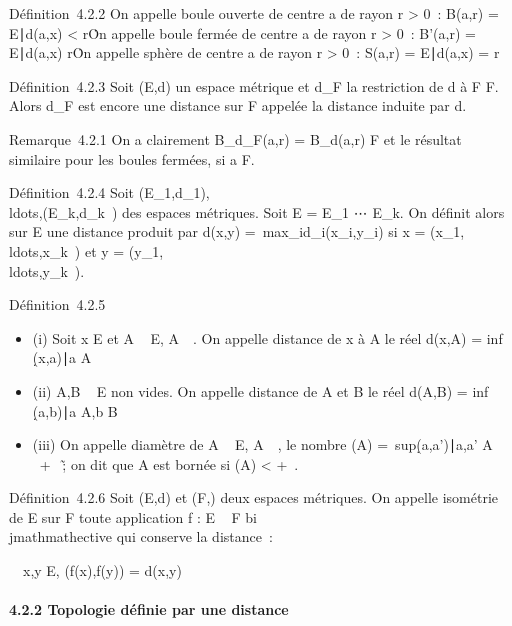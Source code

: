 \documentclass[]{article}
\begin{document}
Définition~4.2.2 On appelle boule ouverte de centre a de rayon r
\textgreater{} 0~: B(a,r) = \x \in
E∣d(a,x) \textless{} r\.

On appelle boule fermée de centre a de rayon r \textgreater{} 0~:
B'(a,r) = \x \in E∣d(a,x) \leq
r\.

On appelle sphère de centre a de rayon r \textgreater{} 0~: S(a,r) =
\x \in E∣d(a,x) =
r\

Définition~4.2.3 Soit (E,d) un espace métrique et d_F la
restriction de d à F \times F. Alors d_F est encore une distance sur
F appelée la distance induite par d.

Remarque~4.2.1 On a clairement B_d_F(a,r) =
B_d(a,r) \bigcap F et le résultat similaire pour les boules fermées,
si a \in F.

Définition~4.2.4 Soit
(E_1,d_1),\\ldots,(E_k,d_k~)
des espaces métriques. Soit E = E_1
\times⋯ \times E_k. On définit alors sur E une
distance produit par d(x,y) =\
max_id_i(x_i,y_i) si x =
(x_1,\\ldots,x_k~)
et y =
(y_1,\\ldots,y_k~).

Définition~4.2.5

\begin{itemize}
\itemsep1pt\parskip0pt
\item
  (i) Soit x \in E et A \subset~ E, A\neq~\varnothing~. On appelle
  distance de x à A le réel d(x,A) = inf~
  \d(x,a)∣a \in
  A\
\item
  (ii) A,B \subset~ E non vides. On appelle distance de A et B le réel d(A,B)
  = inf~
  \d(a,b)∣a \in A,b \in
  B\
\item
  (iii) On appelle diamètre de A \subset~ E, A\neq~\varnothing~, le
  nombre \delta(A) =\
  sup\d(a,a')∣a,a' \in
  A\ \in {}~ \cup\ + \infty~\~; on
  dit que A est bornée si \delta(A) \textless{} +\infty~.
\end{itemize}

Définition~4.2.6 Soit (E,d) et (F,\delta) deux espaces métriques. On appelle
isométrie de E sur F toute application f : E \rightarrow~ F bi\\jmathmathective qui conserve
la distance~:

\forall~~x,y \in E, \delta(f(x),f(y)) = d(x,y)

\paragraph{4.2.2 Topologie définie par une distance}
\end{document}
